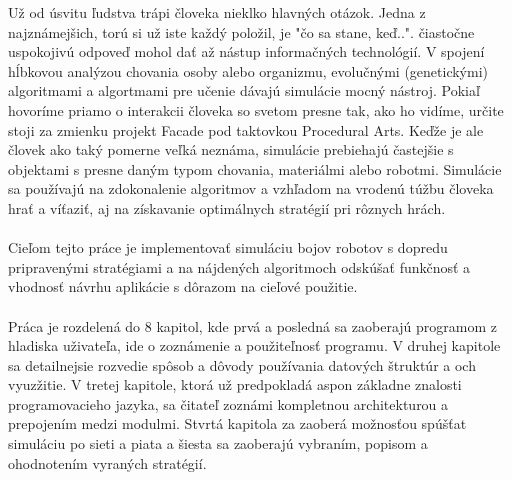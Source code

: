\indent Už od úsvitu ľudstva trápi človeka nieklko hlavných otázok. Jedna z najznámejšich, torú si už iste každý položil, je "čo sa stane, keď..". čiastočne uspokojivú odpoveď mohol dať až nástup informačných technológií. V spojení hĺbkovou analýzou chovania osoby alebo organizmu, evolučnými (genetickými) algoritmami a algortmami pre učenie dávajú simulácie mocný nástroj. Pokiaľ hovoríme priamo o interakcii človeka so svetom presne tak, ako ho vidíme, určite stoji za zmienku projekt Facade pod taktovkou Procedural Arts. Keďže je ale človek ako taký pomerne veľká neznáma, simulácie prebiehajú častejšie s objektami s presne daným typom chovania, materiálmi alebo robotmi. Simulácie sa používajú na zdokonalenie algoritmov a vzhľadom na vrodenú túžbu človeka hrať a víťaziť, aj na získavanie optimálnych stratégií pri rôznych hrách. \\\\
Cieľom tejto práce je implementovať simuláciu bojov robotov s dopredu pripravenými stratégiami a na nájdených algoritmoch odskúšať funkčnosť a vhodnosť návrhu aplikácie s dôrazom na cieľové použitie. \\\\
Práca je rozdelená do 8 kapitol, kde prvá a posledná sa zaoberajú programom z hladiska uživateľa, ide o zoznámenie a použiteľnosť programu. V druhej kapitole sa detailnejsie rozvedie spôsob a dôvody používania datových štruktúr a och vyuzžitie. V tretej kapitole, ktorá už predpokladá aspon základne znalosti programovacieho jazyka, sa čitateľ zoznámi kompletnou architekturou a prepojením medzi modulmi. Stvrtá kapitola za zaoberá možnosťou spúšťat simuláciu po sieti a piata a šiesta sa zaoberajú vybraním, popisom a ohodnotením vyraných stratégií.
